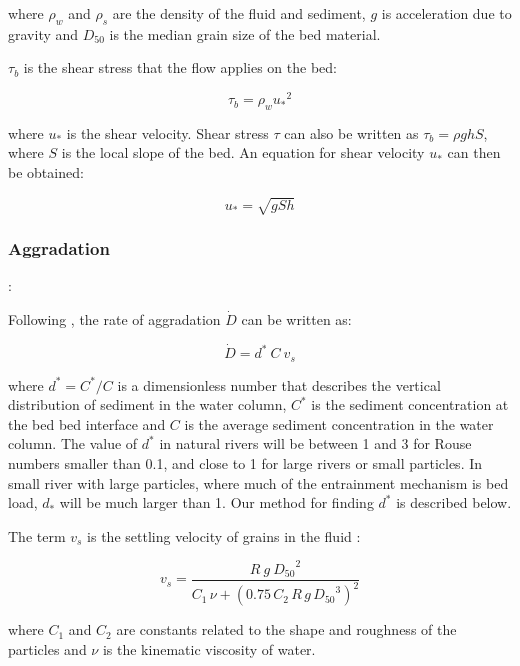 \documentclass[10pt]{article}
\begin{document}
\noindent where $\rho_w$ and $\rho_s$ are the density of the fluid and sediment, $g$ is acceleration due to gravity and $D_{50}$ is the median grain size of the bed material.
 
$\tau_b$ is the shear stress that the flow applies on the bed:

\begin{equation}
\tau_b = \rho_w {u_*}^2
\end{equation}

\noindent where $u_*$ is the shear velocity. Shear stress $\tau$ can also be written as $\tau_b = \rho g h S$, where $S$ is the local slope of the bed. An equation for shear velocity $u_*$ can then be obtained:

\begin{equation}
u_* = \sqrt{g S h}
\end{equation}

\subsubsection{Aggradation}:

Following \citet{davy2009fluvial}, the rate of aggradation $\dot{D}$ can be written as:

\begin{equation}
\dot{D} = d^* \: C \: v_s
\end{equation}

\noindent where $d^* = C^* / C$ is a dimensionless number that describes the vertical distribution of sediment in the water column, $C^*$ is the sediment concentration at the bed bed interface and $C$ is the average sediment concentration in the water column. The value of $d^*$ in natural rivers will be between 1 and 3 for Rouse numbers smaller than 0.1, and close to 1 for large rivers or small particles. In small river with large particles, where much of the entrainment mechanism is bed load, $d_*$ will be much larger than 1. Our method for finding $d^*$ is described below.

The term $v_s$ is the settling velocity of grains in the fluid \citep{ferguson2004simple}:

\begin{equation}
v_s = \frac{R \: g \: {D_{50}}^2}{C_1 \, \nu + (0.75 \, C_2 \, R \, g \, {D_{50}}^3)^2}
\end{equation}

\noindent where $C_1$ and $C_2$ are constants related to the shape and roughness of the particles and $\nu$ is the kinematic viscosity of water. 
\end{document}
